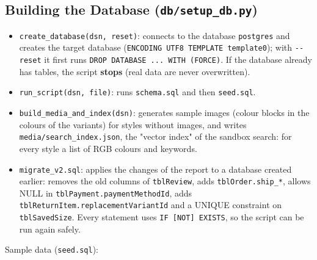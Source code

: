 \hypertarget{building-the-database-dbsetup_db.py}{%
\subsection{\texorpdfstring{Building the Database
(\texttt{db/\allowbreak{}setup\_\allowbreak{}db.\allowbreak{}py})}{Building the Database (db/setup\_db.py)}}\label{building-the-database-dbsetup_db.py}}

\begin{itemize}
\tightlist
\item
  \texttt{create\_\allowbreak{}database(\allowbreak{}dsn,\allowbreak{} reset)}: connects to the database
  \texttt{postgres} and creates the target database
  (\texttt{ENCODING \textquotesingle{}UTF8\textquotesingle{} TEMPLATE template0});
  with \texttt{-\/\allowbreak{}-reset} it first runs
  \texttt{DROP DATABASE .\allowbreak{}.\allowbreak{}.\allowbreak{} WITH (\allowbreak{}FORCE)}. If the database already
  has tables, the script \textbf{stops} (real data are never
  overwritten).
\item
  \texttt{run\_\allowbreak{}script(\allowbreak{}dsn,\allowbreak{} file)}: runs \texttt{schema.\allowbreak{}sql} and then
  \texttt{seed.\allowbreak{}sql}.
\item
  \texttt{build\_\allowbreak{}media\_\allowbreak{}and\_\allowbreak{}index(\allowbreak{}dsn)}: generates sample images
  (colour blocks in the colours of the variants) for styles without
  images, and writes \texttt{media/\allowbreak{}search\_\allowbreak{}index.\allowbreak{}json}, the "vector
  index" of the sandbox search: for every style a list of RGB colours
  and keywords.
\item
  \texttt{migrate\_\allowbreak{}v2.\allowbreak{}sql}: applies the changes of the report to a
  database created earlier: removes the old columns of
  \texttt{tblReview}, adds \texttt{tblOrder.\allowbreak{}ship\_\allowbreak{}*}, allows NULL in
  \texttt{tblPayment.\allowbreak{}paymentMethodId}, adds
  \texttt{tblReturnItem.\allowbreak{}replacementVariantId} and a UNIQUE constraint on
  \texttt{tblSavedSize}. Every statement uses
  \texttt{IF {[}NOT{]} EXISTS}, so the script can be run again safely.
\end{itemize}

Sample data (\texttt{seed.\allowbreak{}sql}):

